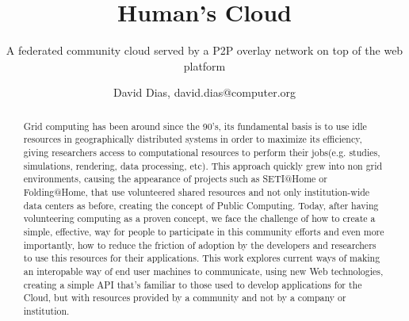 \documentclass{./llncs2e/llncs}
\begin{document}
\title{Human's Cloud}

\subtitle{A federated community cloud served by a P2P overlay network on top of the web platform}
\author{David Dias, david.dias@computer.org}

\maketitle



% 
% 

\begin{abstract}
Grid computing has been around since the 90's, its fundamental basis is to use idle resources in geographically distributed systems in order to maximize its efficiency, giving researchers access to computational resources to perform their jobs(e.g. studies, simulations, rendering, data processing, etc). This approach quickly grew into non grid environments, causing the appearance of projects such as SETI@Home or Folding@Home, that use volunteered shared resources and not only institution-wide data centers as before, creating the concept of Public Computing. Today, after having volunteering computing as a proven concept, we face the challenge of how to create a simple, effective, way for people to participate in this community efforts and even more importantly, how to reduce the friction of adoption by the developers and researchers to use this resources for their applications. This work explores current ways of making an interopable way of end user machines to communicate, using new Web technologies, creating a simple API that's familiar to those used to develop applications for the Cloud, but with resources provided by a community and not by a company or institution.

\end{abstract}




% 
% 
\end{document}
